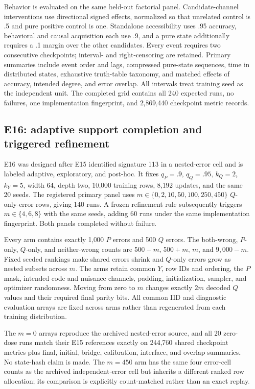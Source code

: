 \documentclass[11pt,a4paper]{article}
\begin{document}
Behavior is evaluated on the same held-out factorial panel. Candidate-channel interventions use directional signed effects, normalized so that unrelated control is .5 and pure positive control is one. Standalone accessibility uses .95 accuracy, behavioral and causal acquisition each use .9, and a pure state additionally requires a .1 margin over the other candidates. Every event requires two consecutive checkpoints; interval- and right-censoring are retained. Primary summaries include event order and lags, compressed pure-state sequences, time in distributed states, exhaustive truth-table taxonomy, and matched effects of accuracy, intended degree, and error overlap. All intervals treat training seed as the independent unit. The completed grid contains all 240 expected runs, no failures, one implementation fingerprint, and 2,869,440 checkpoint metric records.

\subsection{E16: adaptive support completion and triggered refinement}

E16 was designed after E15 identified signature 113 in a nested-error cell and is labeled adaptive, exploratory, and post-hoc. It fixes $q_P=.9$, $q_Q=.95$, $k_Q=2$, $k_Y=5$, width 64, depth two, 10,000 training rows, 8,192 updates, and the same 20 seeds. The registered primary panel uses $m\in\{0,2,10,50,100,250,450\}$ $Q$-only-error rows, giving 140 runs. A frozen refinement rule subsequently triggers $m\in\{4,6,8\}$ with the same seeds, adding 60 runs under the same implementation fingerprint. Both panels completed without failure.

Every arm contains exactly 1,000 $P$ errors and 500 $Q$ errors. The both-wrong, $P$-only, $Q$-only, and neither-wrong counts are $500-m$, $500+m$, $m$, and $9{,}000-m$. Fixed seeded rankings make shared errors shrink and $Q$-only errors grow as nested subsets across $m$. The arms retain common $Y$, row IDs and ordering, the $P$ mask, intended-code and nuisance channels, padding, initialization, sampler, and optimizer randomness. Moving from zero to $m$ changes exactly $2m$ decoded $Q$ values and their required final parity bits. All common IID and diagnostic evaluation arrays are fixed across arms rather than regenerated from each training distribution.

The $m=0$ arrays reproduce the archived nested-error source, and all 20 zero-dose runs match their E15 references exactly on 244,760 shared checkpoint metrics plus final, initial, bridge, calibration, interface, and overlap summaries. No state-hash claim is made. The $m=450$ arm has the same four error-cell counts as the archived independent-error cell but inherits a different ranked row allocation; its comparison is explicitly count-matched rather than an exact replay.
\end{document}
